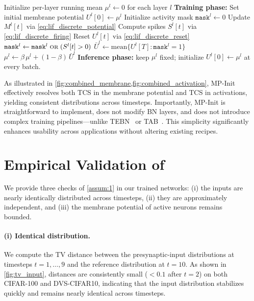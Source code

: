 \begin{algorithm}[h]
\caption{MP-Init: per-layer running-mean initialization}
\label{alg:mpinit}
\begin{algorithmic}[1]
\State Initialize per-layer running mean $\mu^{l}\!\leftarrow\!0$ for each layer $l$
\State \textbf{Training phase:}
  \State Set initial membrane potential $U^{l}[0] \leftarrow \mu^{l}$
  \State Initialize activity mask $\texttt{mask}^{l}\leftarrow 0$
    \State Update $M^{l}[t]$ via \cref{eq:lif_discrete_potential}
    \State Compute spikes $S^{l}[t]$ via \cref{eq:lif_discrete_firing}
    \State Reset $U^{l}[t]$ via \cref{eq:lif_discrete_reset}
    \State $\texttt{mask}^{l}\leftarrow \texttt{mask}^{l}\;\textsc{or}\;(S^{l}[t]>0)$
  \EndFor
  \State $\bar{U}^{l}\leftarrow \mathrm{mean}\{U^{l}[T] : \texttt{mask}^{l}=1\}$ 
  \State $\mu^{l}\leftarrow \beta\,\mu^{l} + (1-\beta)\,\bar{U}^{l}$ 
\EndFor
\State \textbf{Inference phase:} keep $\mu^{l}$ fixed; initialize $U^{l}[0]\leftarrow \mu^{l}$ at every batch.
\end{algorithmic}
\end{algorithm}

As illustrated in \cref{fig:combined_membrane,fig:combined_activation}, MP-Init effectively resolves both TCS in the membrane potential and TCS in activations, yielding consistent distributions across timesteps. Importantly, MP-Init is straightforward to implement, does not modify BN layers, and does not introduce complex training pipelines—unlike TEBN~\cite{tebn:2022} or TAB~\cite{tab:2024}. This simplicity significantly enhances usability across applications without altering existing recipes.

\section{Empirical Validation of \texorpdfstring{}{Assumption 1}}
\label{sec:mpinit_validation}

We provide three checks of \cref{assum:1} in our trained networks: (i) the inputs are nearly identically distributed across timesteps, (ii) they are approximately independent, and (iii) the membrane potential of active neurons remains bounded.

\paragraph{(i) Identical distribution.}
We compute the TV distance between the presynaptic-input distributions at timesteps $t=1,\dots,9$ and the reference distribution at $t=10$. As shown in \cref{fig:tv_input}, distances are consistently small ($<0.1$ after $t=2$) on both CIFAR-100 and DVS-CIFAR10, indicating that the input distribution stabilizes quickly and remains nearly identical across timesteps.

